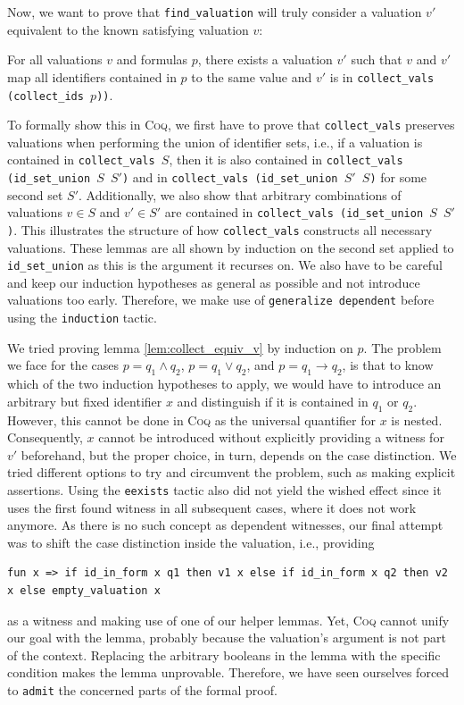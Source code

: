 Now, we want to prove that \texttt{find\_valuation} will truly consider a valuation $v'$ equivalent to the known satisfying valuation $v$:
\begin{lemma}\label{lem:collect_equiv_v}
    For all valuations $v$ and formulas $p$, there exists a valuation $v'$ such that $v$ and $v'$ map all identifiers contained in $p$ to the same value and $v'$ is in \texttt{collect\_vals (collect\_ids $p$))}.
\end{lemma}
To formally show this in \textsc{Coq}, we first have to prove that \texttt{collect\_vals} preserves valuations when performing the union of identifier sets, i.e., if a valuation is contained in \texttt{collect\_vals $S$}, then it is also contained in \texttt{collect\_vals (id\_set\_union $S$ $S'$)} and in \texttt{collect\_vals (id\_set\_union $S'$ $S$)} for some second set $S'$.
Additionally, we also show that arbitrary combinations of valuations $v \in S$ and $v' \in S'$ are contained in \texttt{collect\_vals (id\_set\_union $S$ $S'$)}.
This illustrates the structure of how \texttt{collect\_vals} constructs all necessary valuations.
These lemmas are all shown by induction on the second set applied to \texttt{id\_set\_union} as this is the argument it recurses on.
We also have to be careful and keep our induction hypotheses as general as possible and not introduce valuations too early.
Therefore, we make use of \texttt{generalize dependent} before using the \texttt{induction} tactic.

We tried proving lemma \ref{lem:collect_equiv_v} by induction on $p$.
The problem we face for the cases $p = q_1 \land q_2$, $p = q_1 \lor q_2$, and $p = q_1 \rightarrow q_2$, is that to know which of the two induction hypotheses to apply, we would have to introduce an arbitrary but fixed identifier $x$ and distinguish if it is contained in $q_1$ or $q_2$.
However, this cannot be done in \textsc{Coq} as the universal quantifier for $x$ is nested.
Consequently, $x$ cannot be introduced without explicitly providing a witness for $v'$ beforehand, but the proper choice, in turn, depends on the case distinction.
We tried different options to try and circumvent the problem, such as making explicit assertions.
Using the \texttt{eexists} tactic also did not yield the wished effect since it uses the first found witness in all subsequent cases, where it does not work anymore.
As there is no such concept as dependent witnesses, our final attempt was to shift the case distinction inside the valuation, i.e., providing 
\begin{lstlisting}[language=coq]
fun x => if id_in_form x q1 then v1 x else if id_in_form x q2 then v2 x else empty_valuation x
\end{lstlisting}
as a witness and making use of one of our helper lemmas.
Yet, \textsc{Coq} cannot unify our goal with the lemma, probably because the valuation's argument is not part of the context.
Replacing the arbitrary booleans in the lemma with the specific condition makes the lemma unprovable.
Therefore, we have seen ourselves forced to \texttt{admit} the concerned parts of the formal proof.


